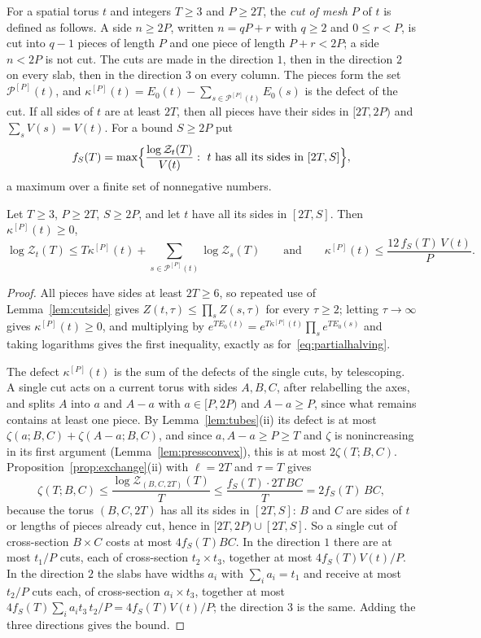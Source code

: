 For a spatial torus $t$ and integers $T\ge3$ and $P\ge2T$, the
\emph{cut of mesh $P$} of $t$ is defined as follows. A side $n\ge2P$, written
$n=qP+r$ with $q\ge2$ and $0\le r<P$, is cut into $q-1$ pieces of length
$P$ and one piece of length $P+r<2P$; a side $n<2P$ is not cut. The cuts
are made in the direction $1$, then in the direction $2$ on every slab, then
in the direction $3$ on every column. The pieces form the set $\mathcal
P^{[P]}(t)$, and $\kappa^{[P]}(t)=E_0(t)-\sum_{s\in\mathcal P^{[P]}(t)}
E_0(s)$ is the defect of the cut. If all sides of $t$ are at least $2T$,
then all pieces have their sides in $[2T,2P)$ and $\sum_sV(s)=V(t)$. For
a bound $S\ge2P$ put
\[
f_S(T)=\max\Bigl\{\frac{\log\mathcal Z_t(T)}{V(t)}:\ t\ \text{has all its
sides in }[2T,S]\Bigr\},
\]
a maximum over a finite set of nonnegative numbers.

\begin{lemma}\label{lem:cutcost}
Let $T\ge3$, $P\ge2T$, $S\ge2P$, and let $t$ have all its sides in
$[2T,S]$. Then $\kappa^{[P]}(t)\ge0$,
\[
\log\mathcal Z_t(T)\le T\kappa^{[P]}(t)+\sum_{s\in\mathcal P^{[P]}(t)}\log
\mathcal Z_s(T)\qquad\text{and}\qquad\kappa^{[P]}(t)\le\frac{12\,f_S(T)\,
V(t)}P .
\]
\end{lemma}

\begin{proof}
All pieces have sides at least $2T\ge6$, so repeated use of
Lemma~\ref{lem:cutside} gives $Z(t,\tau)\le\prod_sZ(s,\tau)$ for every $\tau
\ge2$; letting $\tau\to\infty$ gives $\kappa^{[P]}(t)\ge0$, and multiplying by
$e^{TE_0(t)}=e^{T\kappa^{[P]}(t)}\prod_se^{TE_0(s)}$ and taking logarithms
gives the first inequality, exactly as for~\eqref{eq:partialhalving}.

The defect $\kappa^{[P]}(t)$ is the sum of the defects of the single cuts,
by telescoping. A single cut acts on a current torus with sides $A,B,C$,
after relabelling the axes, and splits $A$ into $a$ and $A-a$ with $a\in
[P,2P)$ and $A-a\ge P$, since what remains contains at least one piece. By
Lemma~\ref{lem:tubes}(ii) its defect is at most $\zeta(a;B,C)+\zeta(A-a;B,
C)$, and since $a,A-a\ge P\ge T$ and $\zeta$ is nonincreasing in its first
argument (Lemma~\ref{lem:pressconvex}), this is at most $2\zeta(T;B,C)$.
Proposition~\ref{prop:exchange}(ii) with $\ell=2T$ and $\tau=T$ gives
\[
\zeta(T;B,C)\le\frac{\log\mathcal Z_{(B,C,2T)}(T)}{T}\le\frac{f_S(T)\cdot
2T\,BC}{T}=2f_S(T)\,BC,
\]
because the torus $(B,C,2T)$ has all its sides in $[2T,S]$: $B$ and $C$ are
sides of $t$ or lengths of pieces already cut, hence in $[2T,2P)\cup[2T,S]$.
So a single cut of cross-section $B\times C$ costs at most $4f_S(T)BC$. In
the direction $1$ there are at most $t_1/P$ cuts, each of cross-section
$t_2\times t_3$, together at most $4f_S(T)V(t)/P$. In the direction $2$ the
slabs have widths $a_i$ with $\sum_ia_i=t_1$ and receive at most $t_2/P$ cuts
each, of cross-section $a_i\times t_3$, together at most $4f_S(T)\sum_ia_i
t_3\,t_2/P=4f_S(T)V(t)/P$; the direction $3$ is the same. Adding the three
directions gives the bound.
\end{proof}

